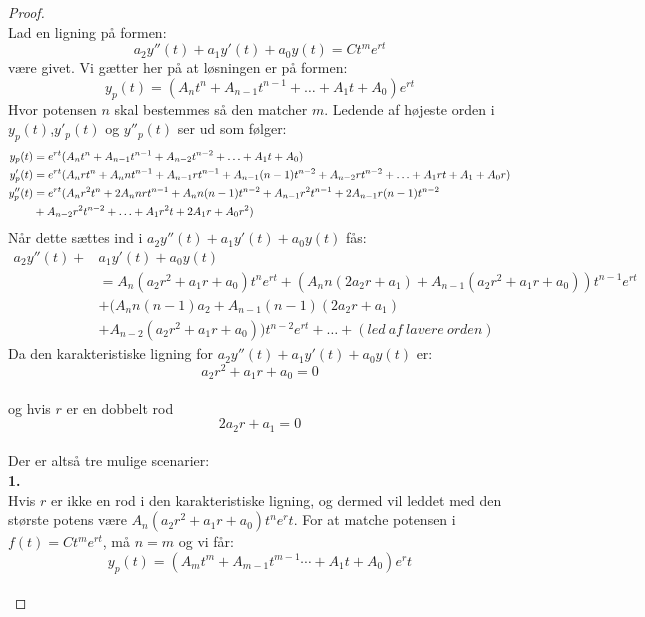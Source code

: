 \begin{proof}\\
Lad en ligning på formen:
\begin{equation*}
a_2y''(t)+a_1y'(t)+a_0y(t)=Ct^me^{rt}
\end{equation*}
være givet. Vi gætter her på at løsningen er på formen:
\begin{equation*}
y_p(t)= (A_nt^n+A_{n-1}t^{n-1} + \hdots +A_1t+A_0)e^{rt}
\end{equation*}
Hvor potensen $n$ skal bestemmes så den matcher $m$.
Ledende af højeste orden i $y_p(t)$,$y'_p(t)$ og $y''_p(t)$ ser ud som følger:
\begin{align*}
     y_p(t) &=e^{rt}(A_nt^n+A_{n-1}t^{n-1}+A_{n-2}t^{n-2}+\hdots + A_1t+A_0) \\ \break
    y'_p(t) &=e^{rt}(A_nrt^n+A_nnt^{n-1}+A_{n-1}rt^{n-1}+A_{n-1}(n-1)t^{n-2}+A_{n-2}rt^{n-2}+\hdots + A_1rt+A_1+A_0r) \\
    y''_p(t) &=e^{rt}(A_nr^2t^n+2A_nnrt^{n-1}+A_nn(n-1)t^{n-2}+A_{n-1}r^2t^{n-1}+2A_{n-1}r(n-1)t^{n-2} \\ 
    &+A_{n-2}r^2t^{n-2}+\hdots + A_1r^2t+2A_1r+A_0r^2)
\end{align*}
Når dette sættes ind i $a_2y''(t)+a_1y'(t)+a_0y(t)$ fås:
\begin{align*}
 a_2y''(t)+ & a_1y'(t)+a_0y(t) \\ 
 & = A_n(a_2r^2+a_1r+a_0)t^ne^{rt} + (A_nn(2a_2r+a_1) +A_{n-1}(a_2r^2+a_1r+a_0))t^{n-1}e^{rt} \\ 
 & +(A_nn(n-1)a_2+A_{n-1}(n-1)(2a_2r+a_1)\\
 &+A_{n-2}(a_2r^2+a_1r+a_0))t^{n-2}e^{rt}+ \hdots + (led\ af\ lavere\ orden)
\end{align*}
Da den karakteristiske ligning for $a_2y''(t)+a_1y'(t)+a_0y(t)$ er: \\
$$a_2r^2+a_1r+a_0=0$$ \\
og hvis $r$ er en dobbelt rod\\
$$2a_2r+a_1=0$$\\ 
Der er altså tre mulige scenarier: \\

\textbf{1.} \\
Hvis $r$ er ikke en rod i den karakteristiske ligning, og dermed vil leddet med den største potens være $A_n(a_2r^2+a_1r+a_0)t^ne^rt$. For at matche potensen i $f(t)=Ct^me^{rt}$, må $n=m$ og vi får: \\
\begin{equation*}
y_p(t)= (A_mt^m+A_{m-1}t^{m-1}  \cdots +A_1t+A_0)e^rt
\end{equation*} \\


\end{proof}
